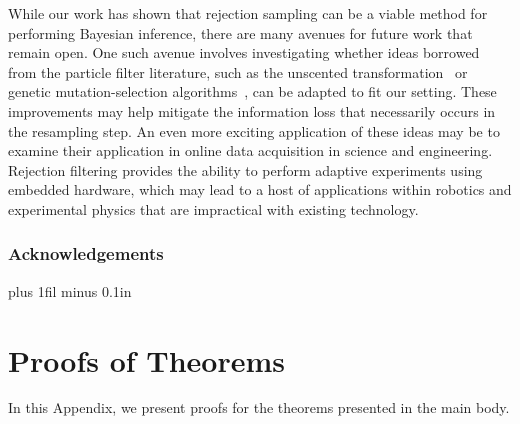 \documentclass[twoside]{article}
\begin{document}
While our work has shown that rejection sampling can be a viable method for performing Bayesian inference, there are many
avenues for future work that remain open.  One such avenue involves investigating whether ideas borrowed from the particle
filter literature, such as the unscented transformation~\cite{van2000unscented} or genetic mutation-selection algorithms~\cite{del2012adaptive,del2000branching}, can be adapted to fit our setting.
  These improvements may help mitigate the information loss that necessarily occurs in the resampling step.  An even more exciting
application of these ideas may be to examine their application in online data acquisition in science and engineering.  Rejection
filtering provides the ability to perform adaptive experiments using embedded hardware, which may lead to a host of applications
within robotics and experimental physics that are impractical with existing technology.


\appendix

\subsubsection*{Acknowledgements}





\clearpage
\onecolumn

\thispagestyle{empty}
  \hsize\textwidth
  \linewidth\hsize {}
 \bottomtitlebar \vskip 0.2in plus 1fil minus 0.1in

\section{Proofs of Theorems}

In this Appendix, we present proofs for the theorems presented in the main
body.
\end{document}

